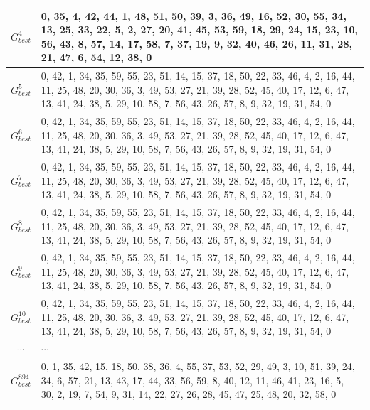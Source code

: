 {{{\begin{tabularx}{\textwidth}{|c|p{11cm}|}
    $G_{best}^{4}$   & 0, 35, 4, 42, 44, 1, 48, 51, 50, 39, 3,   36, 49, 16, 52, 30, 55, 34, 13, 25, 33, 22, 5, 2, 27, 20, 41, 45, 53, 59, 18,   29, 24, 15, 23, 10, 56, 43, 8, 57, 14, 17, 58, 7, 37, 19, 9, 32, 40, 46, 26,   11, 31, 28, 21, 47, 6, 54, 12, 38, 0 \\ \hline
    $G_{best}^{5}$   & 0, 42, 1, 34, 35, 59, 55, 23, 51, 14, 15,   37, 18, 50, 22, 33, 46, 4, 2, 16, 44, 11, 25, 48, 20, 30, 36, 3, 49, 53, 27,   21, 39, 28, 52, 45, 40, 17, 12, 6, 47, 13, 41, 24, 38, 5, 29, 10, 58, 7, 56,   43, 26, 57, 8, 9, 32, 19, 31, 54, 0 \\ \hline
    $G_{best}^{6}$   & 0, 42, 1, 34, 35, 59, 55, 23, 51, 14, 15,   37, 18, 50, 22, 33, 46, 4, 2, 16, 44, 11, 25, 48, 20, 30, 36, 3, 49, 53, 27,   21, 39, 28, 52, 45, 40, 17, 12, 6, 47, 13, 41, 24, 38, 5, 29, 10, 58, 7, 56,   43, 26, 57, 8, 9, 32, 19, 31, 54, 0 \\ \hline
    $G_{best}^{7}$   & 0, 42, 1, 34, 35, 59, 55, 23, 51, 14, 15,   37, 18, 50, 22, 33, 46, 4, 2, 16, 44, 11, 25, 48, 20, 30, 36, 3, 49, 53, 27,   21, 39, 28, 52, 45, 40, 17, 12, 6, 47, 13, 41, 24, 38, 5, 29, 10, 58, 7, 56,   43, 26, 57, 8, 9, 32, 19, 31, 54, 0 \\ \hline
    $G_{best}^{8}$   & 0, 42, 1, 34, 35, 59, 55, 23, 51, 14, 15,   37, 18, 50, 22, 33, 46, 4, 2, 16, 44, 11, 25, 48, 20, 30, 36, 3, 49, 53, 27,   21, 39, 28, 52, 45, 40, 17, 12, 6, 47, 13, 41, 24, 38, 5, 29, 10, 58, 7, 56,   43, 26, 57, 8, 9, 32, 19, 31, 54, 0 \\ \hline
    $G_{best}^{9}$   & 0, 42, 1, 34, 35, 59, 55, 23, 51, 14, 15,   37, 18, 50, 22, 33, 46, 4, 2, 16, 44, 11, 25, 48, 20, 30, 36, 3, 49, 53, 27,   21, 39, 28, 52, 45, 40, 17, 12, 6, 47, 13, 41, 24, 38, 5, 29, 10, 58, 7, 56,   43, 26, 57, 8, 9, 32, 19, 31, 54, 0 \\ \hline
    $G_{best}^{10}$  & 0, 42, 1, 34, 35, 59, 55, 23, 51, 14, 15,   37, 18, 50, 22, 33, 46, 4, 2, 16, 44, 11, 25, 48, 20, 30, 36, 3, 49, 53, 27,   21, 39, 28, 52, 45, 40, 17, 12, 6, 47, 13, 41, 24, 38, 5, 29, 10, 58, 7, 56,   43, 26, 57, 8, 9, 32, 19, 31, 54, 0 \\ \hline
    $\cdots$         & $\cdots$                                                                                                                                                                                                                                      \\ \hline
    $G_{best}^{894}$ & 0, 1, 35, 42, 15, 18, 50, 38, 36, 4, 55, 37,   53, 52, 29, 49, 3, 10, 51, 39, 24, 34, 6, 57, 21, 13, 43, 17, 44, 33, 56, 59,   8, 40, 12, 11, 46, 41, 23, 16, 5, 30, 2, 19, 7, 54, 9, 31, 14, 22, 27, 26,   28, 45, 47, 25, 48, 20, 32, 58, 0 \\ \hline

\end{tabularx}}}}
